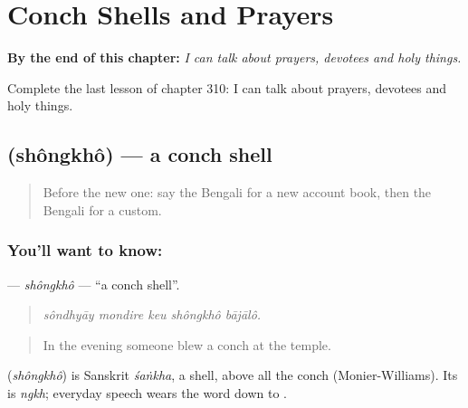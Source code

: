 
\chapter{Conch Shells and Prayers}
\label{ch:bn-conch-shells-and-prayers}

\begin{chapteropening}
\textbf{By the end of this chapter:} \emph{I can talk about prayers, devotees and holy things.}

Complete the last lesson of chapter 310: I can talk about prayers, devotees and holy things.
\end{chapteropening}

\section[\texorpdfstring{\bn{শঙ্খ} (shôngkhô)}{শঙ্খ (shôngkhô)}]{ (shôngkhô) — a conch shell}

\label{lesson:BN-C310-shongkho}



\begin{quote}
Before the new one: say the Bengali for a new account book, then the Bengali for a custom.
\end{quote}

\subsection*{You'll want to know: }
\textbf{} — \emph{shôngkhô} — \textquotedblleft{}a conch shell\textquotedblright{}.

\begin{quote}
    
\end{quote}

\begin{quote}
\emph{sôndhyāy mondire keu shôngkhô bājālô.}
\end{quote}

\begin{quote}
In the evening someone blew a conch at the temple.
\end{quote}

\begin{cousinweb}
\textbf{} (\emph{shôngkhô}) is Sanskrit \emph{śaṅkha}, a shell, above all the conch (Monier-Williams). Its  is \emph{ngkh}; everyday speech wears the word down to .
\end{cousinweb}

